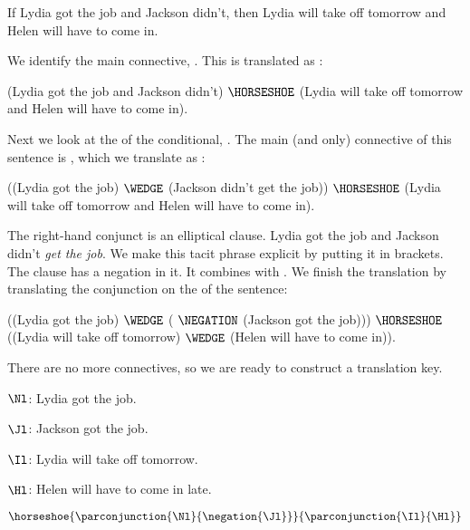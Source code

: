 \begin{majorILnc}{}
	\begin{menumerate}
		\item\label{GSLTransSentenceI} If Lydia got the job and Jackson didn't, then Lydia will take off tomorrow and Helen will have to come in.
	\end{menumerate}
	We identify the main connective, . 
	This is translated as \mention{$\rightarrow$}: 
	\begin{menumerate}
		\item\label{GSLTransSentenceJ} (Lydia got the job and Jackson didn't) $\HORSESHOE$ (Lydia will take off tomorrow and Helen will have to come in).
	\end{menumerate}
	Next we look at the  of the conditional, . 
	The main (and only) connective of this sentence is , which we translate as \mention{$\WEDGE$}: 
	\begin{menumerate}
		\item\label{GSLTransSentenceK} ((Lydia got the job) $\WEDGE$ (Jackson didn't get the job)) $\HORSESHOE$ (Lydia will take off tomorrow and Helen will have to come in).
	\end{menumerate}

	\noindent{}The right-hand conjunct  is an elliptical clause. 
	Lydia got the job and Jackson didn't \emph{get the job}.
	We make this tacit phrase explicit by putting it in brackets. 
	The clause  has a negation in it. It combines  with . 
	We finish the translation by translating the conjunction on the  of the sentence: 
	\begin{menumerate}
		\item\label{GSLTransSentenceL} ((Lydia got the job) $\WEDGE$ ( $\NEGATION$ (Jackson got the job))) $\HORSESHOE$ ((Lydia will take off tomorrow) $\WEDGE$ (Helen will have to come in)).
	\end{menumerate}
	There are no more connectives, so we are ready to construct a translation key. 
	\begin{description}[itemsep=0em]
		\item[Translation Key:] \hfill{} 
		\begin{description}[itemsep=0em]
			\item[] $\Nl$: Lydia got the job.
			\item[] $\Jl$: Jackson got the job. 
			\item[] $\Il$: Lydia will take off tomorrow.
			\item[] $\Hl$: Helen will have to come in late.  
		\end{description}
	\end{description}
	\begin{menumerate}
		\item\label{GSLTransSentenceM} $\horseshoe{\parconjunction{\Nl}{\negation{\Jl}}}{\parconjunction{\Il}{\Hl}}$
	\end{menumerate}
\end{majorILnc}


